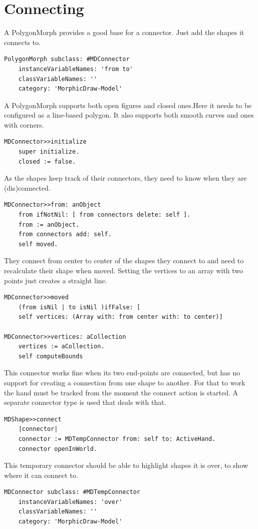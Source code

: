 \documentclass[10pt]{article}   	%
\begin{document}
\section{Connecting}
A PolygonMorph provides a good base for a connector.
Just add the shapes it connects to.
\begin{verbatim}
PolygonMorph subclass: #MDConnector
    instanceVariableNames: 'from to'
    classVariableNames: ''
    category: 'MorphicDraw-Model'
\end{verbatim}
A PolygonMorph supports both open 
figures and closed ones.Here it needs to be configured 
as a line-based polygon. It also supports both
smooth curves and ones with corners.
\begin{verbatim}
MDConnector>>initialize
    super initialize.
    closed := false.
\end{verbatim}
As the shapes keep track of their connectors, they need
to know when they are (dis)connected.
\begin{verbatim}
MDConnector>>from: anObject
    from ifNotNil: [ from connectors delete: self ].
    from := anObject.
    from connectors add: self.
    self moved.
\end{verbatim}
They connect from center to center of the shapes they connect to
and need to recalculate their shape when moved. Setting the 
vertices to an array with two points just creates a straight line.
\begin{verbatim}
MDConnector>>moved
    (from isNil | to isNil )ifFalse: [
    self vertices: (Array with: from center with: to center)]

MDConnector>>vertices: aCollection
	vertices := aCollection.
	self computeBounds
\end{verbatim}
This connector works fine when its two end-points are connected,
but has no support for creating a connection from one shape to 
another. For that to work the hand must be tracked from the
moment the connect action is started. A separate connector
type is used that deals with that.
\begin{verbatim}
MDShape>>connect
    |connector|
    connector := MDTempConnector from: self to: ActiveHand.
    connector openInWorld.
\end{verbatim}
This temporary connector should be able to highlight shapes it is 
over, to show where it can connect to.
\begin{verbatim}
MDConnector subclass: #MDTempConnector
    instanceVariableNames: 'over'
    classVariableNames: ''
    category: 'MorphicDraw-Model'
\end{verbatim}
\end{document}
